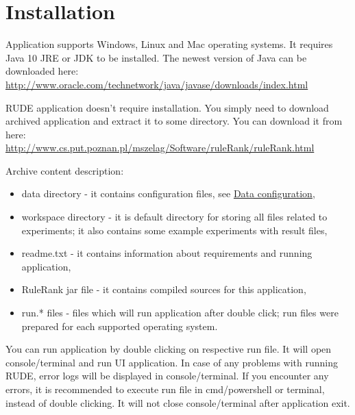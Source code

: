 \section{Installation}\label{section:install}

Application supports Windows, Linux and Mac operating systems. It requires Java 10 JRE or JDK to be installed. The newest version of Java can be downloaded here:\\ \href{http://www.oracle.com/technetwork/java/javase/downloads/index.html}{http://www.oracle.com/technetwork/java/javase/downloads/index.html}


RUDE application doesn't require installation. You simply need to download archived application and extract it to some directory. You can download it from here:\\ \href{http://www.cs.put.poznan.pl/mszelag/Software/ruleRank/ruleRank.html}{http://www.cs.put.poznan.pl/mszelag/Software/ruleRank/ruleRank.html}\newline

Archive content description:
\begin{itemize}
	\item data directory - it contains configuration files, see \hyperref[section:data-config]{Data configuration},
	\item workspace directory - it is default directory for storing all files related to experiments; it also contains some example experiments with result files,
	\item readme.txt - it contains information about requirements and running application,
	\item RuleRank jar file - it contains compiled sources for this application,
	\item run.* files - files which will run application after double click; run files were prepared for each supported operating system.
\end{itemize}

You can run application by double clicking on respective run file. It will open console/terminal and run UI application. In case of any problems with running RUDE, error logs will be displayed in console/terminal. If you encounter any errors, it is recommended to execute run file in cmd/powershell or terminal, instead of double clicking. It will not close console/terminal after application exit.


\vfill\newpage